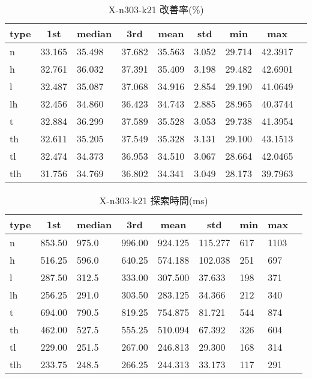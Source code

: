 \begin{table}[htbp]
    \caption{X-n303-k21 改善率(\%)}
    \begin{tabular}{|l|l|l|l|l|l|l|l|l|}\hline
    \multicolumn{1}{|c|}{\textbf{type}}
    &\multicolumn{1}{|c|}{\textbf{1st}}
    &\multicolumn{1}{c|}{\textbf{median}}
    &\multicolumn{1}{c|}{\textbf{3rd}}
    &\multicolumn{1}{c|}{\textbf{mean}}
    &\multicolumn{1}{c|}{\textbf{std}}
    &\multicolumn{1}{c|}{\textbf{min}}
    &\multicolumn{1}{c|}{\textbf{max}}\\\hline
	n & 33.165 & 35.498 & 37.682 & 35.563 & 3.052 & 29.714 & 42.3917\\\hline
	h & 32.761 & 36.032 & 37.391 & 35.409 & 3.198 & 29.482 & 42.6901\\\hline
	l & 32.487 & 35.087 & 37.068 & 34.916 & 2.854 & 29.190 & 41.0649\\\hline
	lh & 32.456 & 34.860 & 36.423 & 34.743 & 2.885 & 28.965 & 40.3744\\\hline
	t & 32.884 & 36.299 & 37.589 & 35.528 & 3.053 & 29.738 & 41.3954\\\hline
	th & 32.611 & 35.205 & 37.549 & 35.328 & 3.131 & 29.100 & 43.1513\\\hline
	tl & 32.474 & 34.373 & 36.953 & 34.510 & 3.067 & 28.664 & 42.0465\\\hline
	tlh & 31.756 & 34.769 & 36.802 & 34.341 & 3.049 & 28.173 & 39.7963\\\hline
	\end{tabular}
\end{table}
\begin{table}[htbp]
    \caption{X-n303-k21 探索時間(ms)}
    \begin{tabular}{|l|l|l|l|l|l|l|l|l|}\hline
    \multicolumn{1}{|c|}{\textbf{type}}
    &\multicolumn{1}{|c|}{\textbf{1st}}
    &\multicolumn{1}{c|}{\textbf{median}}
    &\multicolumn{1}{c|}{\textbf{3rd}}
    &\multicolumn{1}{c|}{\textbf{mean}}
    &\multicolumn{1}{c|}{\textbf{std}}
    &\multicolumn{1}{c|}{\textbf{min}}
    &\multicolumn{1}{c|}{\textbf{max}}\\\hline
	n & 853.50 & 975.0 & 996.00 & 924.125 & 115.277 & 617 & 1103\\\hline
	h & 516.25 & 596.0 & 640.25 & 574.188 & 102.038 & 251 & 697\\\hline
	l & 287.50 & 312.5 & 333.00 & 307.500 & 37.633 & 198 & 371\\\hline
	lh & 256.25 & 291.0 & 303.50 & 283.125 & 34.366 & 212 & 340\\\hline
	t & 694.00 & 790.5 & 819.25 & 754.875 & 81.721 & 544 & 874\\\hline
	th & 462.00 & 527.5 & 555.25 & 510.094 & 67.392 & 326 & 604\\\hline
	tl & 229.00 & 251.5 & 267.00 & 246.813 & 29.300 & 168 & 314\\\hline
	tlh & 233.75 & 248.5 & 266.25 & 244.313 & 33.173 & 117 & 291\\\hline
	\end{tabular}
\end{table}

